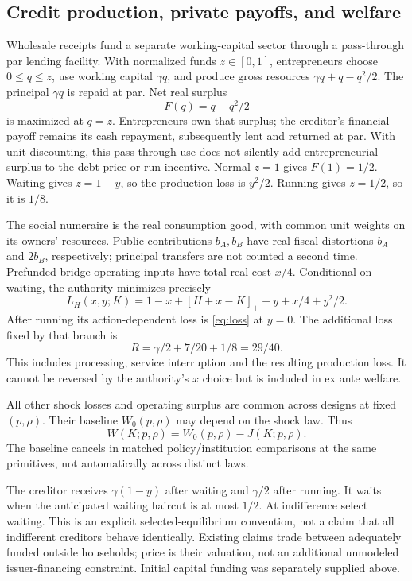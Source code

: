 \documentclass[11pt,a4paper]{article}
\numberwithin{equation}{section}
\theoremstyle{definition}
\begin{document}
\subsection{Credit production, private payoffs, and welfare}
Wholesale receipts fund a separate working-capital sector through a
pass-through par lending facility. With normalized funds \(z\in[0,1]\),
entrepreneurs choose \(0\le q\le z\), use working capital \(\gamma q\),
and produce gross resources
\(\gamma q+q-q^2/2\). The principal \(\gamma q\) is repaid at par.
Net real surplus
\[
 F(q)=q-q^2/2
\]
is maximized at \(q=z\). Entrepreneurs own that surplus; the creditor's
financial payoff remains its cash repayment, subsequently lent and
returned at par. With unit discounting, this pass-through use does not
silently add entrepreneurial surplus to the debt price or run incentive.
Normal \(z=1\) gives \(F(1)=1/2\). Waiting gives \(z=1-y\), so the
production loss is \(y^2/2\). Running gives \(z=1/2\), so it is \(1/8\).

The social numeraire is the real consumption good, with common unit
weights on its owners' resources. Public contributions \(b_A,b_B\) have
real fiscal distortions \(b_A\) and \(2b_B\), respectively; principal
transfers are not counted a second time. Prefunded bridge operating inputs
have total real cost \(x/4\). Conditional on waiting, the authority
minimizes precisely
\begin{equation}\label{eq:loss}
 L_H(x,y;K)
 =1-x+[H+x-K]_+-y+x/4+y^2/2.
\end{equation}
After running its action-dependent loss is \eqref{eq:loss} at \(y=0\).
The additional loss fixed by that branch is
\begin{equation}\label{eq:runloss}
 R=\gamma/2+7/20+1/8=29/40.
\end{equation}
This includes processing, service interruption and the resulting
production loss. It cannot be reversed by the authority's \(x\) choice
but is included in ex ante welfare.

All other shock losses and operating surplus are common across designs
at fixed \((p,\rho)\). Their baseline \(W_0(p,\rho)\) may depend on the
shock law. Thus
\[
 W(K;p,\rho)=W_0(p,\rho)-J(K;p,\rho).
\]
The baseline cancels in matched policy/institution comparisons at the
same primitives, not automatically across distinct laws.

The creditor receives \(\gamma(1-y)\) after waiting and \(\gamma/2\)
after running. It waits when the anticipated waiting haircut is at most
\(1/2\). At indifference select waiting. This is an explicit
selected-equilibrium convention, not a claim that all indifferent
creditors behave identically. Existing claims trade between adequately
funded outside households; price is their valuation, not an additional
unmodeled issuer-financing constraint. Initial capital funding was
separately supplied above.
\end{document}
